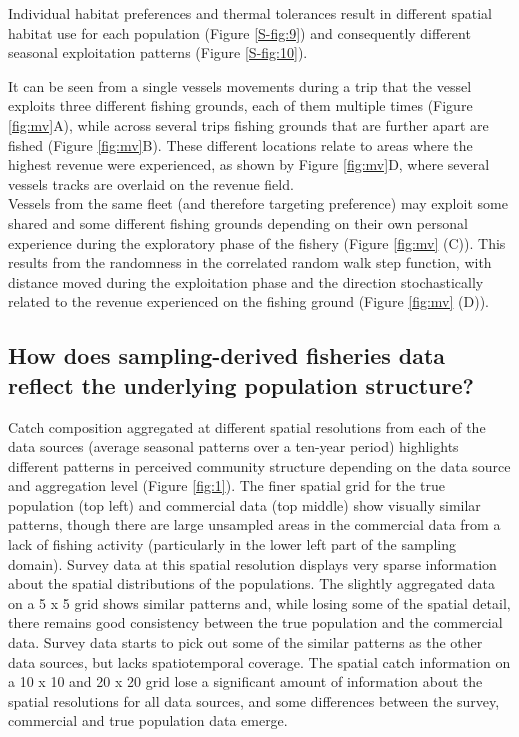 \documentclass[preprint]{elsarticle}
\begin{document}
Individual habitat preferences and thermal tolerances result in different
spatial habitat use for each population (Figure \ref{S-fig:9}) and consequently
different seasonal exploitation patterns (Figure \ref{S-fig:10}). 

It can be seen from a single vessels movements during a trip that the vessel
exploits three different fishing grounds, each of them multiple times (Figure
\ref{fig:mv}A), while across several trips fishing grounds that are further
apart are fished (Figure \ref{fig:mv}B). These different locations relate to
areas where the highest revenue were experienced, as shown by Figure
\ref{fig:mv}D, where several vessels tracks are overlaid on the revenue field.
\\

Vessels from the same fleet (and therefore targeting preference) may exploit
some shared and some different fishing grounds depending on their own personal
experience during the exploratory phase of the fishery (Figure \ref{fig:mv} (C)).
This results from the randomness in the correlated random walk step function,
with distance moved during the exploitation phase and the direction
stochastically related to the revenue experienced on the fishing ground (Figure
\ref{fig:mv} (D)). 

\subsection{How does sampling-derived fisheries data reflect the underlying
	population structure?}

Catch composition aggregated at different spatial resolutions from each of the
data sources (average seasonal patterns over a ten-year period) highlights
different patterns in perceived community structure depending on the data
source and aggregation level (Figure \ref{fig:1}). The finer spatial grid for
the true population (top left) and commercial data (top middle) show visually
similar patterns, though there are large unsampled areas in the commercial data
from a lack of fishing activity (particularly in the lower left part of the
sampling domain). Survey data at this spatial resolution
displays very sparse information about the spatial distributions of the
populations. The slightly aggregated data on a 5 x 5 grid shows similar
patterns and, while losing some of the spatial detail, there remains good
consistency between the true population and the commercial data. Survey data
starts to pick out some of the similar patterns as the other data sources, but
lacks spatiotemporal coverage. The spatial catch information on a 10 x 10 and
20 x 20 grid lose a significant amount of information about the spatial
resolutions for all data sources, and some differences between the survey,
commercial and true population data emerge. \\
\end{document}
